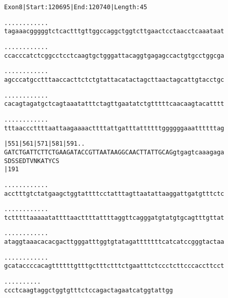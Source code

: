 \documentclass{article}
\begin{document}
\begin{alltt}
Exon 8 | Start: 120695 | End: 120740 | Length: 45

.    .    .    .    .    .    .    .    .    .    .    .    
tagaaacgggggtctcactttgttggccaggctggtcttgaactcctaacctcaaataat

.    .    .    .    .    .    .    .    .    .    .    .    
ccacccatctcggcctcctcaagtgctgggattacaggtgagagccactgtgcctggcga

.    .    .    .    .    .    .    .    .    .    .    .    
agcccatgcctttaaccacttctctgtattacatactagcttaactagcattgtacctgc

.    .    .    .    .    .    .    .    .    .    .    .    
cacagtagatgctcagtaaatatttctagttgaatatctgtttttcaacaagtacatttt

.    .    .    .    .    .    .    .    .    .    .    .    
tttaacccttttaattaagaaaacttttattgatttattttttggggggaaattttttag

   |551      |561      |571      |581      |591   .    .    
GATCTGATTCTTCTGAAGATACCGTTAATAAGGCAACTTATTGCAGgtgagtcaaagaga
  S  D  S  S  E  D  T  V  N  K  A  T  Y  C  S               
                       |191                                 

.    .    .    .    .    .    .    .    .    .    .    .    
acctttgtctatgaagctggtattttcctatttagttaatattaaggattgatgtttctc

.    .    .    .    .    .    .    .    .    .    .    .    
tctttttaaaaatattttaacttttattttaggttcagggatgtatgtgcagtttgttat

.    .    .    .    .    .    .    .    .    .    .    .    
ataggtaaacacacgacttgggatttggtgtatagatttttttcatcatccgggtactaa

.    .    .    .    .    .    .    .    .    .    .    .    
gcataccccacagttttttgtttgctttctttctgaatttctccctcttcccaccttcct

.    .    .    .    .    .    .    .    .    .
ccctcaagtaggctggtgtttctccagactagaatcatggtattgg
\end{alltt}
\newpage
\end{document}
